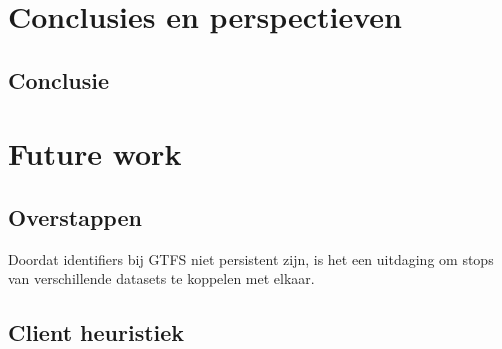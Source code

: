 
\chapter{Conclusies en perspectieven}

\section{Conclusie}

\chapter{Future work}

\section{Overstappen}

Doordat identifiers bij GTFS niet persistent zijn, is het een uitdaging om stops van verschillende datasets te koppelen met elkaar.

\section{Client heuristiek}

